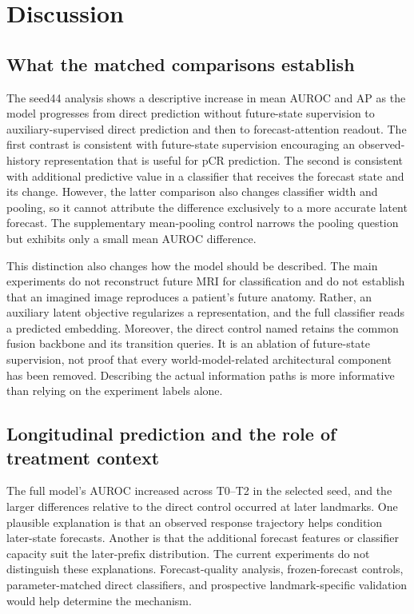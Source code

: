 \section{Discussion}
\label{sec:discussion}
\subsection{What the matched comparisons establish}
The seed44 analysis shows a descriptive increase in mean AUROC and AP as the model progresses from direct prediction without future-state supervision to auxiliary-supervised direct prediction and then to forecast-attention readout. The first contrast is consistent with future-state supervision encouraging an observed-history representation that is useful for pCR prediction. The second is consistent with additional predictive value in a classifier that receives the forecast state and its change. However, the latter comparison also changes classifier width and pooling, so it cannot attribute the difference exclusively to a more accurate latent forecast. The supplementary mean-pooling control narrows the pooling question but exhibits only a small mean AUROC difference.

This distinction also changes how the model should be described. The main experiments do not reconstruct future MRI for classification and do not establish that an imagined image reproduces a patient's future anatomy. Rather, an auxiliary latent objective regularizes a representation, and the full classifier reads a predicted embedding. Moreover, the direct control named \nojepa{} retains the common fusion backbone and its transition queries. It is an ablation of future-state supervision, not proof that every world-model-related architectural component has been removed. Describing the actual information paths is more informative than relying on the experiment labels alone.

\subsection{Longitudinal prediction and the role of treatment context}
The full model's AUROC increased across T0--T2 in the selected seed, and the larger differences relative to the direct control occurred at later landmarks. One plausible explanation is that an observed response trajectory helps condition later-state forecasts. Another is that the additional forecast features or classifier capacity suit the later-prefix distribution. The current experiments do not distinguish these explanations. Forecast-quality analysis, frozen-forecast controls, parameter-matched direct classifiers, and prospective landmark-specific validation would help determine the mechanism.

